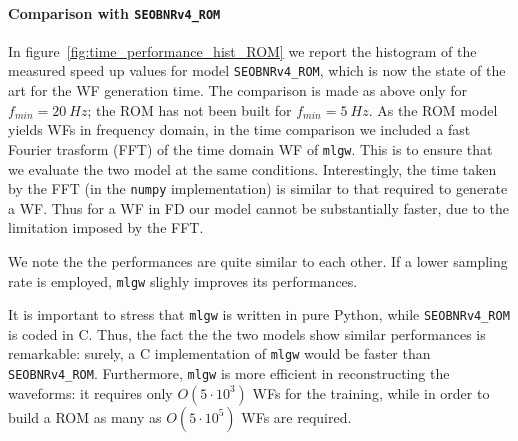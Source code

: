 \paragraph{Comparison with \texttt{SEOBNRv4\_ROM}}
In figure~\ref{fig:time_performance_hist_ROM} we report the histogram of the measured speed up values for model \texttt{SEOBNRv4\_ROM}, which is now the state of the art for the WF generation time.
The comparison is made as above only for $f_{min} = \SI{20}{Hz}$; the ROM has not been built for $f_{min} = \SI{5}{Hz}$.
As the ROM model yields WFs in frequency domain, in the time comparison we included a fast Fourier trasform (FFT) of the time domain WF of \texttt{mlgw}. This is to ensure that we evaluate the two model at the same conditions.
Interestingly, the time taken by the FFT (in the \texttt{numpy} implementation) is similar to that required to generate a WF. Thus for a WF in FD our model cannot be substantially faster, due to the limitation imposed by the FFT.
\par
We note the the performances are quite similar to each other.
If a lower sampling rate is employed, \texttt{mlgw} slighly improves its performances.
\par
It is important to stress that \texttt{mlgw} is written in pure Python, while \texttt{SEOBNRv4\_ROM} is coded in C. Thus, the fact the the two models show similar performances is remarkable: surely, a C implementation of \texttt{mlgw} would be faster than \texttt{SEOBNRv4\_ROM}.
Furthermore, \texttt{mlgw} is more efficient in reconstructing the waveforms: it requires only $O(5\cdot 10^3)$ WFs for the training, while in order to build a ROM as many as $O(5\cdot 10^5)$ WFs are required.
\par
